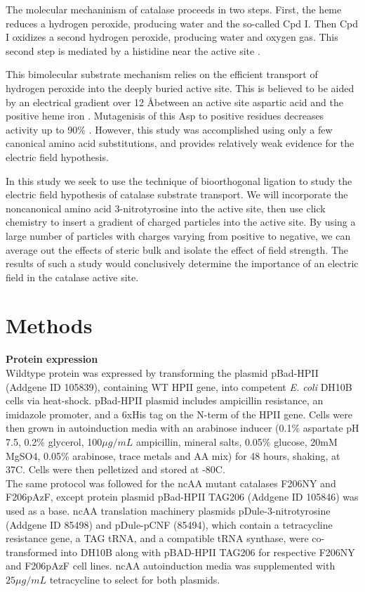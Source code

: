\documentclass[journal=jacsat,manuscript=article]{achemso}
\begin{document}
The molecular mechaninism of catalase proceeds in two steps. First, the heme reduces a hydrogen peroxide, producing water and the so-called Cpd I. Then Cpd I oxidizes a second hydrogen peroxide, producing water and oxygen gas. This second step is mediated by a histidine near the active site \cite{alfonso-prieto}.

This bimolecular substrate mechanism relies on the efficient transport of hydrogen peroxide into the deeply buried active site. This is believed to be aided by an electrical gradient over 12 \AA between an active site aspartic acid and the positive heme iron \cite{chelikani}. Mutagenisis of this Asp to positive residues decreases activity up to 90\% \cite{chelikani}. However, this study was accomplished using only a few canonical amino acid substitutions, and provides relatively weak evidence for the electric field hypothesis.

In this study we seek to use the technique of bioorthogonal ligation to study the electric field hypothesis of catalase substrate transport. We will incorporate the noncanonical amino acid 3-nitrotyrosine into the active site, then use click chemistry to insert a gradient of charged particles into the active site. By using a large number of particles with charges varying from positive to negative, we can average out the effects of steric bulk and isolate the effect of field strength. The results of such a study would conclusively determine the importance of an electric field in the catalase active site.\\

\section{Methods}
\textbf{Protein expression}\\
Wildtype protein was expressed by transforming the plasmid pBad-HPII (Addgene ID 105839), containing WT HPII gene, into competent \textit{E. coli} DH10B cells via heat-shock. pBad-HPII plasmid includes ampicillin resistance, an imidazole promoter, and a 6xHis tag on the N-term of the HPII gene. Cells were then grown in autoinduction media with an arabinose inducer (0.1\% aspartate pH 7.5, 0.2\% glycerol, 100$\mu g / mL$ ampicillin, mineral salts, 0.05\% glucose, 20mM MgSO4, 0.05\% arabinose, trace metals and AA mix) for 48 hours, shaking, at 37C. Cells were then pelletized and stored at -80C.\\

The same protocol was followed for the ncAA mutant catalases F206NY and F206pAzF, except protein plasmid pBad-HPII TAG206 (Addgene ID 105846) was used as a base. ncAA translation machinery plasmids pDule-3-nitrotyrosine (Addgene ID 85498) and pDule-pCNF (85494), which contain a tetracycline resistance gene, a TAG tRNA, and a compatible tRNA synthase, were co-transformed into DH10B along with pBAD-HPII TAG206 for respective F206NY and F206pAzF cell lines. ncAA autoinduction media was supplemented with $25\mu g / mL$ tetracycline to select for both plasmids.\\
\end{document}
